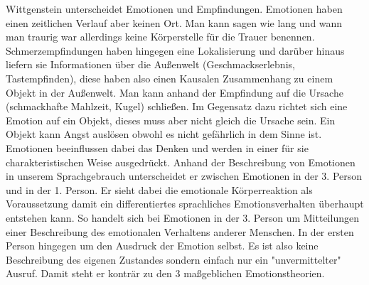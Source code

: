 Wittgenstein unterscheidet Emotionen und Empfindungen. Emotionen haben einen zeitlichen Verlauf aber keinen Ort. Man kann sagen wie lang und wann man traurig war allerdings keine Körperstelle für die Trauer benennen. Schmerzempfindungen haben hingegen eine Lokalisierung und darüber hinaus liefern sie Informationen über die Außenwelt (Geschmackserlebnis, Tastempfinden), diese haben also einen Kausalen Zusammenhang zu einem Objekt in der Außenwelt. Man kann anhand der Empfindung auf die Ursache (schmackhafte Mahlzeit, Kugel) schließen. Im Gegensatz dazu richtet sich eine Emotion auf ein Objekt, dieses muss aber nicht gleich die Ursache sein. Ein Objekt kann Angst auslösen obwohl es nicht gefährlich in dem Sinne ist. Emotionen beeinflussen dabei das Denken und werden in einer für sie charakteristischen Weise ausgedrückt. Anhand der Beschreibung von Emotionen in unserem Sprachgebrauch unterscheidet er zwischen Emotionen in der 3. Person und in der 1. Person. Er sieht dabei die emotionale Körperreaktion als Voraussetzung damit ein differentiertes sprachliches Emotionsverhalten überhaupt entstehen kann. So handelt sich bei Emotionen in der 3. Person um Mitteilungen einer Beschreibung des emotionalen Verhaltens anderer Menschen. In der ersten Person hingegen um den Ausdruck der Emotion selbst. Es ist also keine Beschreibung des eigenen Zustandes sondern einfach nur ein "unvermittelter" Ausruf. Damit steht er konträr zu den 3 maßgeblichen Emotionstheorien.
